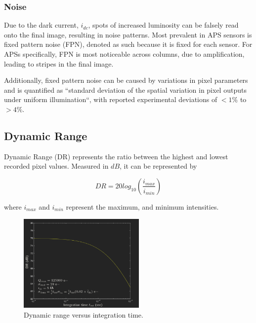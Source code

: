 \subsubsection{Noise}

Due to the dark current, \(i_{dc}\), spots of increased luminosity can be falsely read onto the final image, resulting in noise
patterns. Most prevalent in APS sensors is fixed pattern noise (FPN), denoted as such because it is fixed for each sensor.
For APSs specifically, FPN is most noticeable across columns, due to amplification, leading to stripes in the final image. \cite{stanford}

Additionally, fixed pattern noise can be caused by variations in pixel parameters and is quantified as ``standard 
deviation of the spatial variation in pixel outputs under uniform illumination``, with reported experimental
deviations of \(<1\%\) to \(>4\%\).

\subsection{Dynamic Range}

Dynamic Range (DR) represents the ratio between the highest and lowest recorded pixel values. 
Measured in \(dB\), it can be represented by 

\begin{equation}
    \label{eqDR}
    DR = 20log_{10}(\frac{i_{max}}{i_{min}})
\end{equation}

where \(i_{max}\) and \(i_{min}\) represent the maximum, and minimum intensities. 

\begin{figure}[H]
    \includegraphics[width=0.55\textwidth, height=0.50\textwidth]{resources/png/drgraph.png}
    \caption{Dynamic range versus integration time. \cite{stanford} \label{figDR}}
\end{figure}

